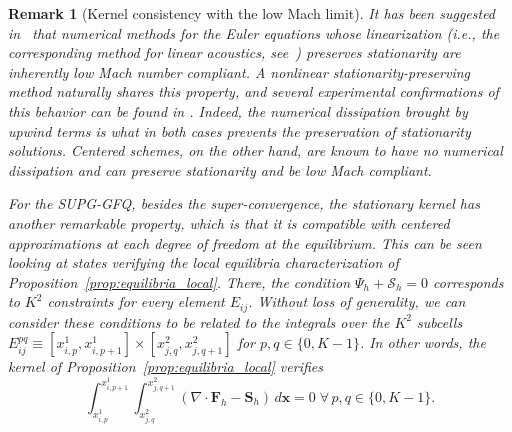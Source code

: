 \documentclass[a4paper,10pt]{article}
\newtheorem{remark}[theorem]{Remark}
\begin{document}
\begin{remark}[Kernel consistency with the low Mach limit] 
	It has been suggested in~\cite{barsukow2019stationarity} that numerical methods for the Euler equations whose linearization 
	(i.e., the corresponding method for linear acoustics, see~\cite{barsukow2025structure}) preserves stationarity are inherently low Mach number compliant. 
	A nonlinear stationarity-preserving method naturally shares this property, and several experimental confirmations of this behavior can be found in \cite{barsukow2018low}.
	Indeed, the numerical dissipation brought by upwind terms is what in both cases prevents the preservation of stationarity solutions.
	Centered schemes, on the other hand, are known to have no numerical dissipation and can preserve stationarity and be low Mach compliant.
	
	For the SUPG-GFQ,  besides the super-convergence, the stationary kernel has another remarkable property, which is that 
	it is compatible with centered approximations at each degree of freedom at the equilibrium.
	This can be seen looking at states verifying the local equilibria characterization 
	of Proposition~\ref{prop:equilibria_local}. There, the condition $\Psi_h+\mathcal{S}_h=0$ corresponds to $K^2$ constraints for every element $E_{ij}$.
	Without loss of generality, we can consider these conditions to be related to the integrals over the $K^2$ subcells $E_{ij}^{pq}\equiv [ x_{i,p}^1, x_{i,p+1}^1 ]\times[x_{j,q}^2, x_{j,q+1}^2]$ for $p,q\in\{0, K-1\}$.
	In other words, the kernel of Proposition~\ref{prop:equilibria_local} verifies
	$$
	\int_{x_{i,p}^1}^{ x_{i,p+1}^1 } \int_{x_{j,q}^2}^{ x_{j,q+1}^2} (\nabla\cdot\mathbf{F}_h -\mathbf{S}_h)\,d\mathbf{x} =0 \;\forall \,p,q\in\{0, K-1\}.
	$$
	

\end{remark}
\end{document}
